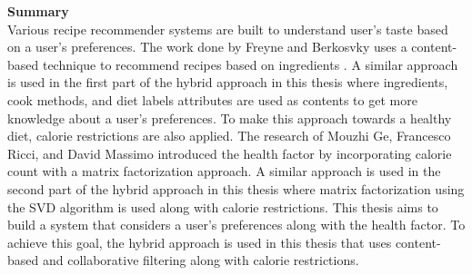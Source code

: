 
\noindent \textbf{Summary}
\\
Various recipe recommender systems are built to understand user's taste based on a user's preferences. The work done by Freyne and Berkosvky uses a content-based technique to recommend recipes based on ingredients \cite{13}. A similar approach is used in the first part of the hybrid approach in this thesis where ingredients, cook methods, and diet labels attributes are used as contents to get more knowledge about a user's preferences. To make this approach towards a healthy diet, calorie restrictions are also applied. The research of Mouzhi Ge, Francesco Ricci, and David Massimo introduced the health factor by incorporating calorie count with a matrix factorization approach\cite{16}. A similar approach is used in the second part of the hybrid approach in this thesis where matrix factorization using the SVD algorithm is used along with calorie restrictions. This thesis aims to build a system that considers a user's preferences along with the health factor. To achieve this goal, the hybrid approach is used in this thesis that uses content-based and collaborative filtering along with calorie restrictions.
